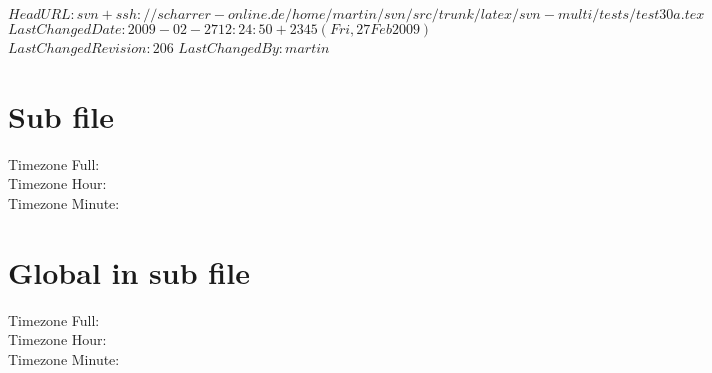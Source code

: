 \svnidlong
{$HeadURL: svn+ssh://scharrer-online.de/home/martin/svn/src/trunk/latex/svn-multi/tests/test30a.tex $}
{$LastChangedDate: 2009-02-27 12:24:50 +2345 (Fri, 27 Feb 2009) $}
{$LastChangedRevision: 206 $}
{$LastChangedBy: martin $}

\section{Sub file}
Timezone Full:   \svnfiletimezone\\
Timezone Hour:   \svnfiletimezonehour\\
Timezone Minute: \svnfiletimezoneminute\\
%
%

\section{Global in sub file}
Timezone Full:   \svntimezone\\
Timezone Hour:   \svntimezonehour\\
Timezone Minute: \svntimezoneminute\\
%
%

